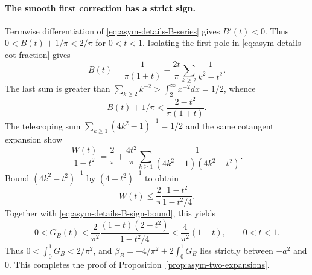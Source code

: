 \paragraph{The smooth first correction has a strict sign.}
Termwise differentiation of \eqref{eq:asym-details-B-series} gives
$B'(t)<0$.  Thus $0<B(t)+1/\pi<2/\pi$ for $0<t<1$.
Isolating the first pole in
\eqref{eq:asym-details-cot-fraction} gives
\[
 B(t)=\frac1{\pi(1+t)}-\frac{2t}{\pi}
                         \sum_{k\geq2}\frac1{k^2-t^2}.
\]
The last sum is greater than
$\sum_{k\geq2}k^{-2}>\int_2^\infty x^{-2}dx=1/2$, whence
\begin{equation}\label{eq:asym-details-B-sign-bound}
 B(t)+1/\pi<\frac{2-t^2}{\pi(1+t)}.
\end{equation}
The telescoping sum $\sum_{k\geq1}(4k^2-1)^{-1}=1/2$ and the
same cotangent expansion show
\[
 \frac{W(t)}{1-t^2}=\frac2\pi+\frac{4t^2}{\pi}
    \sum_{k\geq1}\frac1{(4k^2-1)(4k^2-t^2)}.
\]
Bound $(4k^2-t^2)^{-1}$ by $(4-t^2)^{-1}$ to obtain
\[
 W(t)\leq\frac2\pi\frac{1-t^2}{1-t^2/4}.
\]
Together with \eqref{eq:asym-details-B-sign-bound}, this yields
\[
 0<G_B(t)<\frac2{\pi^2}
       \frac{(1-t)(2-t^2)}{1-t^2/4}
       <\frac4{\pi^2}(1-t),\qquad 0<t<1.
\]
Thus $0<\int_0^1G_B<2/\pi^2$, and
$\beta_B=-4/\pi^2+2\int_0^1G_B$ lies strictly between
$-a^2$ and $0$.  This completes the proof of
Proposition~\ref{prop:asym-two-expansions}.
